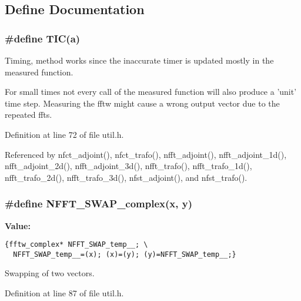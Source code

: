 \subsection{Define Documentation}
\hypertarget{group__nfftutil_g05909fc22b7177d1bd50119f40fbb1ec}{
\subsubsection{\setlength{\rightskip}{0pt plus 5cm}\#define TIC(a)}}
\label{group__nfftutil_g05909fc22b7177d1bd50119f40fbb1ec}


Timing, method works since the inaccurate timer is updated mostly in the measured function. 

For small times not every call of the measured function will also produce a 'unit' time step. Measuring the fftw might cause a wrong output vector due to the repeated ffts. 

Definition at line 72 of file util.h.

Referenced by nfct\_\-adjoint(), nfct\_\-trafo(), nfft\_\-adjoint(), nfft\_\-adjoint\_\-1d(), nfft\_\-adjoint\_\-2d(), nfft\_\-adjoint\_\-3d(), nfft\_\-trafo(), nfft\_\-trafo\_\-1d(), nfft\_\-trafo\_\-2d(), nfft\_\-trafo\_\-3d(), nfst\_\-adjoint(), and nfst\_\-trafo().\hypertarget{group__nfftutil_g4df074728562efbb458f6662e649d1d5}{
\subsubsection{\setlength{\rightskip}{0pt plus 5cm}\#define NFFT\_\-SWAP\_\-complex(x, y)}}
\label{group__nfftutil_g4df074728562efbb458f6662e649d1d5}


\textbf{Value:}

\begin{Code}\begin{verbatim}{fftw_complex* NFFT_SWAP_temp__; \
  NFFT_SWAP_temp__=(x); (x)=(y); (y)=NFFT_SWAP_temp__;}
\end{verbatim}
\end{Code}
Swapping of two vectors. 



Definition at line 87 of file util.h.

